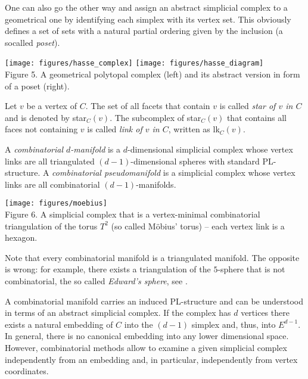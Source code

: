 \documentclass[a4paper,11pt]{report}
\begin{document}
{{ One can also go the other way and assign an abstract simplicial complex to a
geometrical one by identifying each simplex with its vertex set. This
obviously defines a set of sets with a natural partial ordering given by the
inclusion (a socalled \emph{poset}). 

 
		\begin{center}
			\texttt{[image: figures/hasse\_complex]}\quad
			\texttt{[image: figures/hasse\_diagram]}\\\bigskip
			{\small Figure 5. A geometrical polytopal complex (left) and its abstract version in form of a poset (right).}
		\end{center}
	 

 Let $v$ be a vertex of $C$. The set of all facets that contain $v$ is called \emph{star of $v$ in $C$} and is denoted by star$_C(v)$. The subcomplex of star$_C(v)$ that contains all faces not containing $v$ is called \emph{link of $v$ in $C$}, written as lk$_C(v)$. 

 

 A \emph{combinatorial $d$-manifold} is a $d$-dimensional simplicial complex whose vertex links are all triangulated $(d-1)$-dimensional spheres with standard PL-structure. A \emph{combinatorial pseudomanifold} is a simplicial complex whose vertex links are all combinatorial $(d-1)$-manifolds. 

 
		\begin{center}
			\texttt{[image: figures/moebius]}\\\bigskip
			{\small Figure 6. A simplicial complex that is a vertex-minimal combinatorial triangulation of the torus $T^2$ (so called M\"obius' torus) -- each vertex link is a hexagon.} 
		\end{center}
		
	 

 Note that every combinatorial manifold is a triangulated manifold. The
opposite is wrong: for example, there exists a triangulation of the $5$-sphere that is not combinatorial, the so called \emph{Edward's sphere}, see \cite{Bjoerner00SimplMnfBistellarFlips}. 

 A combinatorial manifold carries an induced PL-structure and can be understood
in terms of an abstract simplicial complex. If the complex has $d$ vertices there exists a natural embedding of $C$ into the $(d-1)$ simplex and, thus, into $E^{d-1}$. In general, there is no canonical embedding into any lower dimensional
space. However, combinatorial methods allow to examine a given simplicial
complex independently from an embedding and, in particular, independently from
vertex coordinates. 

}}
\end{document}
